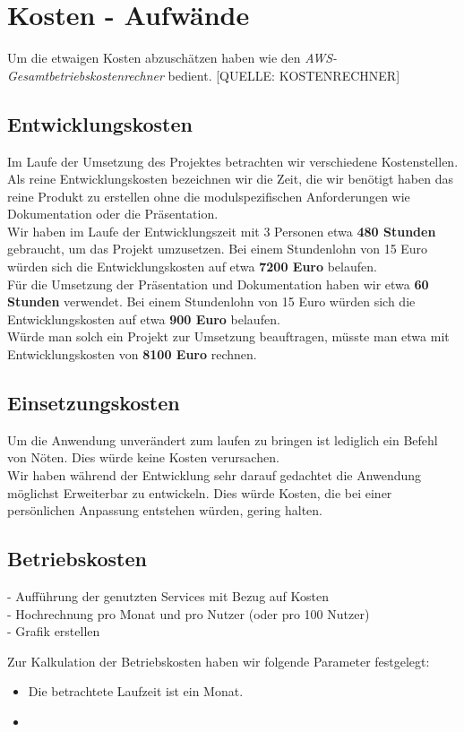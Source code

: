 \documentclass[a4paper, 12pt]{scrreprt}
\begin{document}
\chapter{Kosten - Aufwände}
Um die etwaigen Kosten abzuschätzen haben wie den \textit{AWS-Gesamtbetriebskostenrechner} bedient. [QUELLE: KOSTENRECHNER] 
\section{Entwicklungskosten}
Im Laufe der Umsetzung des Projektes betrachten wir verschiedene Kostenstellen. Als reine Entwicklungskosten bezeichnen wir die Zeit, die wir benötigt haben das reine Produkt zu erstellen ohne die modulspezifischen Anforderungen wie Dokumentation oder die Präsentation. \\
Wir haben im Laufe der Entwicklungszeit mit 3 Personen etwa \textbf{480 Stunden} gebraucht, um das Projekt umzusetzen. Bei einem Stundenlohn von 15 Euro würden sich die Entwicklungskosten auf etwa \textbf{7200 Euro} belaufen. \\
Für die Umsetzung der Präsentation und Dokumentation haben wir etwa \textbf{60 Stunden} verwendet. Bei einem Stundenlohn von 15 Euro würden sich die Entwicklungskosten auf etwa \textbf{900 Euro} belaufen. \\
Würde man solch ein Projekt zur Umsetzung beauftragen, müsste man etwa mit Entwicklungskosten von \textbf{8100 Euro} rechnen.
\section{Einsetzungskosten}
Um die Anwendung unverändert zum laufen zu bringen ist lediglich ein Befehl von Nöten. Dies würde keine Kosten verursachen. \\
Wir haben während der Entwicklung sehr darauf gedachtet die Anwendung möglichst Erweiterbar zu entwickeln. Dies würde Kosten, die bei einer persönlichen Anpassung entstehen würden, gering halten.
\section{Betriebskosten}
- Aufführung der genutzten Services mit Bezug auf Kosten\\
- Hochrechnung pro Monat und pro Nutzer (oder pro 100 Nutzer) \\
- Grafik erstellen

Zur Kalkulation der Betriebskosten haben wir folgende Parameter festgelegt:
\begin{itemize}
\item Die betrachtete Laufzeit ist ein Monat.
\item 
\end{itemize}


\clearpage

%
\end{document}
